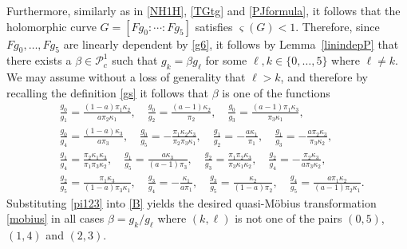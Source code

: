\documentclass{amsart}
\theoremstyle{definition}
\numberwithin{equation}{section}
\numberwithin{theorem}{section}
\begin{document}
Furthermore, similarly as in \eqref{NH1H}, \eqref{TGtg} and \eqref{PJformula}, it follows that the holomorphic curve $G=[Fg_0:\cdots:Fg_5]$ satisfies $\varsigma(G)<1$. Therefore, since $Fg_0,\ldots,Fg_5$ are linearly dependent by \eqref{g6}, it follows by Lemma~\ref{linindepP} that there exists a $\beta\in\mathcal{P}_c^1$ such that $g_k=\beta g_\ell$ for some $\ell,k\in\{0,\ldots,5\}$ where $\ell\not=k$. We may assume without a loss of
generality that $\ell >k$, and therefore by recalling the
definition \eqref{gs} it follows that $\beta$ is one of the
functions
    \begin{equation}\label{B}
    \begin{split}
    &\frac{g_0}{g_1}=\frac{(1-a)\pi_1\kappa_2}{a\pi_2\kappa_1},\quad
    \frac{g_0}{g_2}=\frac{(a-1)\kappa_2}{\pi_2}
    ,\quad \frac{g_0}{g_3}=\frac{(a-1)\pi_1\kappa_3}{\pi_3\kappa_1},\\
    &\frac{g_0}{g_4}=\frac{(1-a)\kappa_3}{a\pi_3},\quad \frac{g_0}{g_5}=-\frac{\pi_1\kappa_2\kappa_3}{\pi_2\pi_3\kappa_1},
    \quad\frac{g_1}{g_2}=-\frac{a\kappa_1}{\pi_1},
    \quad\frac{g_1}{g_3}=-\frac{a\pi_2\kappa_3}{\pi_3\kappa_2},\\
    & \frac{g_1}{g_4}=\frac{\pi_2\kappa_1\kappa_3}{\pi_1\pi_3\kappa_2},\quad \frac{g_1}{g_5}=\frac{a\kappa_3}{(a-1)\pi_3},
    \quad\frac{g_2}{g_3}=\frac{\pi_1\pi_2\kappa_3}{\pi_3\kappa_1\kappa_2},
    \quad \frac{g_2}{g_4}=-\frac{\pi_2\kappa_3}{a\pi_3\kappa_2}, \\ &\frac{g_2}{g_5}=\frac{
    \pi_1\kappa_3}{(1-a)\pi_3\kappa_1},\quad\frac{g_3}{g_4}=-\frac{\kappa_1}{a\pi_1},
    \quad \frac{g_3}{g_5}=\frac{\kappa_2}{(1-a)\pi_2},\quad
    \frac{g_4}{g_5}=\frac{a\pi_1\kappa_2}{(a-1)\pi_2\kappa_1}.
    \end{split}
    \end{equation}
Substituting \eqref{pi123} into \eqref{B} yields the desired
quasi-M\"obius transformation \eqref{mobius} in all cases
$\beta=g_k/g_\ell$ where $(k,\ell)$ is not one of the pairs
$(0,5)$, $(1,4)$ and $(2,3)$.
\end{document}
